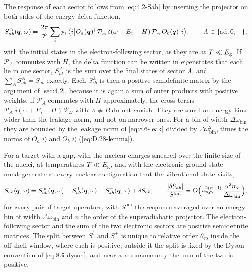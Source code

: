 The response of each sector follows from \cref{eq:4.2-Sab} by inserting the projector on both sides of the energy delta function,
\begin{equation}
  S^A_{ab}(\bm{q},\omega) = \frac{2\pi}{\mathscr{V}}\sum_ip_i\,\bigl\langle i\big|O_a(\bm{q})^\dagger\,\mathcal{P}_A\,\delta(\omega + E_i - H)\,\mathcal{P}_A\,O_b(\bm{q})\big|i\bigr\rangle , \qquad A \in \{\mathrm{ad}, 0, +\} ,
  \label{eq:8.6-sector}
\end{equation}
with the initial states in the electron-following sector, as they are at $T \ll E_{\mathrm{g}}$. If $\mathcal{P}_A$ commutes with $H$, the delta function can be written in eigenstates that each lie in one sector, $S^A_{ab}$ is the sum over the final states of sector $A$, and $\sum_AS^A_{ab} = S_{ab}$ exactly. Each $S^A_{ab}$ is then a positive semidefinite matrix by the argument of \cref{sec:4.2}, because it is again a sum of outer products with positive weights. If $\mathcal{P}_A$ commutes with $H$ approximately, the cross terms $\mathcal{P}_A\,\delta(\omega + E_i - H)\,\mathcal{P}_B$ with $A \neq B$ do not vanish. They are small on energy bins wider than the leakage norm, and not on narrower ones. For a bin of width $\Delta\omega_{\mathrm{bin}}$ they are bounded by the leakage norm of \cref{eq:8.6-leak} divided by $\Delta\omega_{\mathrm{bin}}^2$, times the norms of $O_a|i\rangle$ and $O_b|i\rangle$ (\cref{eq:D.28-lemma}).
\begin{keyresult}
For a target with a gap, with the nuclear charges smeared over the finite size of the nuclei, at temperatures $T \ll E_{\mathrm{g}}$, and with the electronic ground state nondegenerate at every nuclear configuration that the vibrational state visits,
\begin{equation}
  S_{ab}(\bm{q},\omega) = S^{\mathrm{ad}}_{ab}(\bm{q},\omega) + S^0_{ab}(\bm{q},\omega) + S^+_{ab}(\bm{q},\omega) + \delta S_{ab} , \qquad
  \frac{|\delta S_{ab}|}{S^{\mathrm{bin}}} = O\Bigl(\kappa_{\mathrm{BO}}^{2(n+1)}\,\frac{\alpha^2m_e}{\Delta\omega_{\mathrm{bin}}}\Bigr) ,
  \label{eq:8.6-decomp}
\end{equation}
for every pair of target operators, with $S^{\mathrm{bin}}$ the response averaged over an energy bin of width $\Delta\omega_{\mathrm{bin}}$ and $n$ the order of the superadiabatic projector. The electron-following sector and the sum of the two electronic sectors are positive semidefinite matrices. The split between $S^0$ and $S^+$ is unique to relative order $\theta_{\mathrm{ep}}$ inside the off-shell window, where each is positive; outside it the split is fixed by the Dyson convention of \cref{eq:8.6-dyson}, and near a resonance only the sum of the two is positive.
\end{keyresult}
